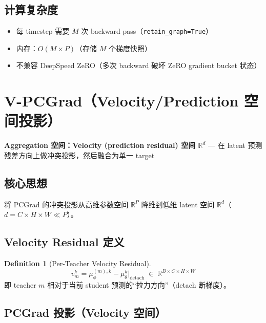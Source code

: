 \documentclass[11pt,a4paper]{article}
\newcommand{\R}{\mathbb{R}}
\newcommand{\mutheta}{\mu_\theta}
\newcommand{\muphi}{\mu_\phi}
\newcommand{\detach}{\mathrm{detach}}
\theoremstyle{definition}
\newtheorem{definition}{Definition}
\begin{document}
\subsection{计算复杂度}

\begin{itemize}[leftmargin=1.5em]
\item 每 timestep 需要 $M$ 次 backward pass（\texttt{retain\_graph=True}）
\item 内存：$O(M \times P)$（存储 $M$ 个梯度快照）
\item 不兼容 DeepSpeed ZeRO（多次 backward 破坏 ZeRO gradient bucket 状态）
\end{itemize}

\section{V-PCGrad（Velocity/Prediction 空间投影）}
\label{sec:v_pcgrad}

\begin{tcolorbox}[colback=purple!5, colframe=purple!50]
\textbf{Aggregation 空间：Velocity (prediction residual) 空间 $\R^d$} — 在 latent 预测残差方向上做冲突投影，然后融合为单一 target
\end{tcolorbox}

\subsection{核心思想}

将 PCGrad 的冲突投影从高维参数空间 $\R^P$ 降维到低维 latent 空间 $\R^d$（$d = C\!\times\!H\!\times\!W \ll P$）。

\subsection{Velocity Residual 定义}

\begin{definition}[Per-Teacher Velocity Residual]
\begin{equation}
v_m^k = \muphi^{(m),k} - \mutheta^k\big|_{\detach} \;\in\; \R^{B \times C \times H \times W}
\label{eq:velocity_residual}
\end{equation}
即 teacher $m$ 相对于当前 student 预测的``拉力方向''（detach 断梯度）。
\end{definition}

\subsection{PCGrad 投影（Velocity 空间）}
\end{document}
